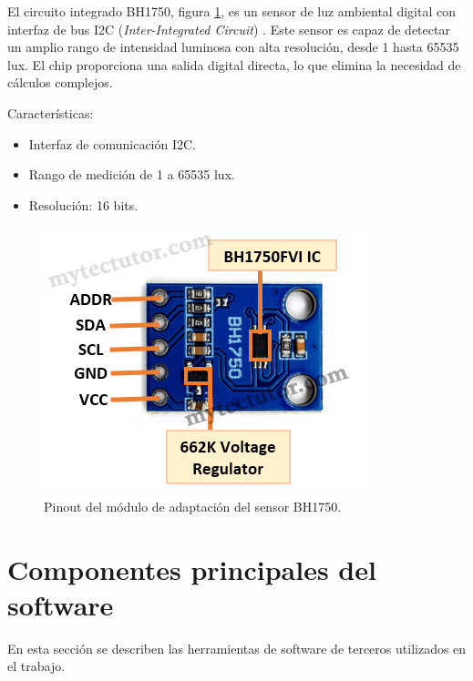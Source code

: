 El circuito integrado BH1750, figura \ref{fig:BH1750}, es un sensor de luz ambiental digital con interfaz de bus I2C (\textit{Inter-Integrated Circuit}) \cite{BH1750}. Este sensor es capaz de detectar un amplio rango de intensidad luminosa con alta resolución, desde 1 hasta 65535 lux. El chip proporciona una salida digital directa, lo que elimina la necesidad de cálculos complejos.

Características:

\begin{itemize}
	\item Interfaz de comunicación I2C.
	\item Rango de medición de 1 a 65535 lux.
	\item Resolución: 16 bits.
\end{itemize}

\begin{figure}[h]
\centering
\includegraphics[scale=.5]{./Figures/BH1750.png}
	\caption{Pinout del módulo de adaptación del sensor BH1750\protect\footnotemark.}
	\label{fig:BH1750}
\end{figure}





\section{Componentes principales del software}
\label{sec:sw:components}
En esta sección se describen las herramientas de software de terceros utilizados en el trabajo.



